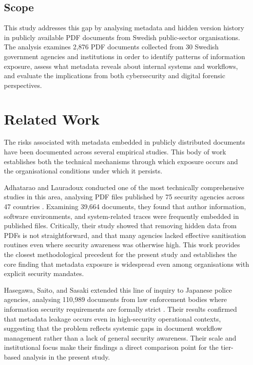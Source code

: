 \documentclass[conference]{IEEEtran}
\begin{document}
\subsection{Scope}
This study addresses this gap by analysing metadata and hidden version history in publicly available PDF documents from Swedish public-sector organisations. The analysis examines 2,876 PDF documents collected from 30 Swedish government agencies and institutions in order to identify patterns of information exposure, assess what metadata reveals about internal systems and workflows, and evaluate the implications from both cybersecurity and digital forensic perspectives.

\section{Related Work}
The risks associated with metadata embedded in publicly distributed documents have been documented across several empirical studies. This body of work establishes both the technical mechanisms through which exposure occurs and the organisational conditions under which it persists.

Adhatarao and Lauradoux conducted one of the most technically comprehensive studies in this area, analysing PDF files published by 75 security agencies across 47 countries \cite{adhatarao2021}. Examining 39,664 documents, they found that author information, software environments, and system-related traces were frequently embedded in published files. Critically, their study showed that removing hidden data from PDFs is not straightforward, and that many agencies lacked effective sanitisation routines even where security awareness was otherwise high. This work provides the closest methodological precedent for the present study and establishes the core finding that metadata exposure is widespread even among organisations with explicit security mandates.

Hasegawa, Saito, and Sasaki extended this line of inquiry to Japanese police agencies, analysing 110,989 documents from law enforcement bodies where information security requirements are formally strict \cite{hasegawa2022}. Their results confirmed that metadata leakage occurs even in high-security operational contexts, suggesting that the problem reflects systemic gaps in document workflow management rather than a lack of general security awareness. Their scale and institutional focus make their findings a direct comparison point for the tier-based analysis in the present study.
\end{document}
